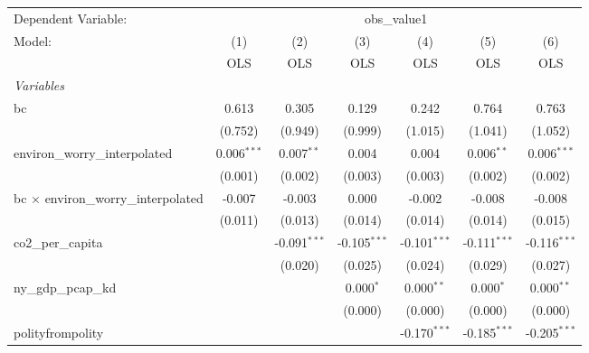 
\begingroup
\centering
\begin{tabular}{lcccccc}
   \toprule
   Dependent Variable: & \multicolumn{6}{c}{obs\_value1}\\
   Model:                                      & (1)           & (2)            & (3)            & (4)            & (5)            & (6)\\  
                                               &  OLS          & OLS            & OLS            & OLS            & OLS            & OLS\\  
   \midrule
   \emph{Variables}\\
   bc                                          & 0.613         & 0.305          & 0.129          & 0.242          & 0.764          & 0.763\\   
                                               & (0.752)       & (0.949)        & (0.999)        & (1.015)        & (1.041)        & (1.052)\\   
   environ\_worry\_interpolated                & 0.006$^{***}$ & 0.007$^{**}$   & 0.004          & 0.004          & 0.006$^{**}$   & 0.006$^{***}$\\   
                                               & (0.001)       & (0.002)        & (0.003)        & (0.003)        & (0.002)        & (0.002)\\   
   bc $\times$ environ\_worry\_interpolated    & -0.007        & -0.003         & 0.000          & -0.002         & -0.008         & -0.008\\   
                                               & (0.011)       & (0.013)        & (0.014)        & (0.014)        & (0.014)        & (0.015)\\   
   co2\_per\_capita                            &               & -0.091$^{***}$ & -0.105$^{***}$ & -0.101$^{***}$ & -0.111$^{***}$ & -0.116$^{***}$\\   
                                               &               & (0.020)        & (0.025)        & (0.024)        & (0.029)        & (0.027)\\   
   ny\_gdp\_pcap\_kd                           &               &                & 0.000$^{*}$    & 0.000$^{**}$   & 0.000$^{*}$    & 0.000$^{**}$\\   
                                               &               &                & (0.000)        & (0.000)        & (0.000)        & (0.000)\\   
   polityfrompolity                            &               &                &                & -0.170$^{***}$ & -0.185$^{***}$ & -0.205$^{***}$\\   

\end{tabular}
